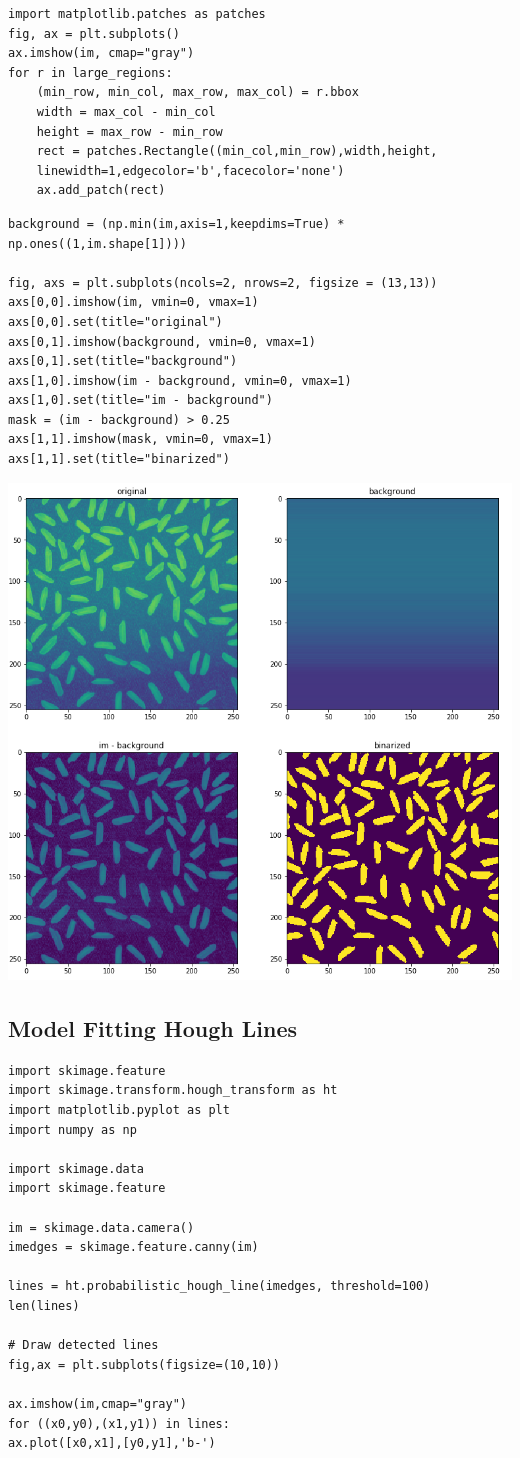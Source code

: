 \begin{verbatim}
import matplotlib.patches as patches
fig, ax = plt.subplots()
ax.imshow(im, cmap="gray")
for r in large_regions:
	(min_row, min_col, max_row, max_col) = r.bbox
	width = max_col - min_col
	height = max_row - min_row
	rect = patches.Rectangle((min_col,min_row),width,height,
	linewidth=1,edgecolor='b',facecolor='none')
	ax.add_patch(rect)
\end{verbatim}

\begin{verbatim}
background = (np.min(im,axis=1,keepdims=True) * np.ones((1,im.shape[1])))

fig, axs = plt.subplots(ncols=2, nrows=2, figsize = (13,13))
axs[0,0].imshow(im, vmin=0, vmax=1)
axs[0,0].set(title="original")
axs[0,1].imshow(background, vmin=0, vmax=1)
axs[0,1].set(title="background")
axs[1,0].imshow(im - background, vmin=0, vmax=1)
axs[1,0].set(title="im - background")
mask = (im - background) > 0.25
axs[1,1].imshow(mask, vmin=0, vmax=1)
axs[1,1].set(title="binarized")
\end{verbatim}
\begin{center}
	\includegraphics[width=0.7\linewidth]{img/BinarizedRiceGrains}
\end{center}

\subsection{Model Fitting Hough Lines}
\begin{verbatim}
import skimage.feature
import skimage.transform.hough_transform as ht
import matplotlib.pyplot as plt
import numpy as np

import skimage.data
import skimage.feature

im = skimage.data.camera()
imedges = skimage.feature.canny(im)

lines = ht.probabilistic_hough_line(imedges, threshold=100)
len(lines)

# Draw detected lines
fig,ax = plt.subplots(figsize=(10,10))

ax.imshow(im,cmap="gray")
for ((x0,y0),(x1,y1)) in lines:
ax.plot([x0,x1],[y0,y1],'b-')
\end{verbatim}

